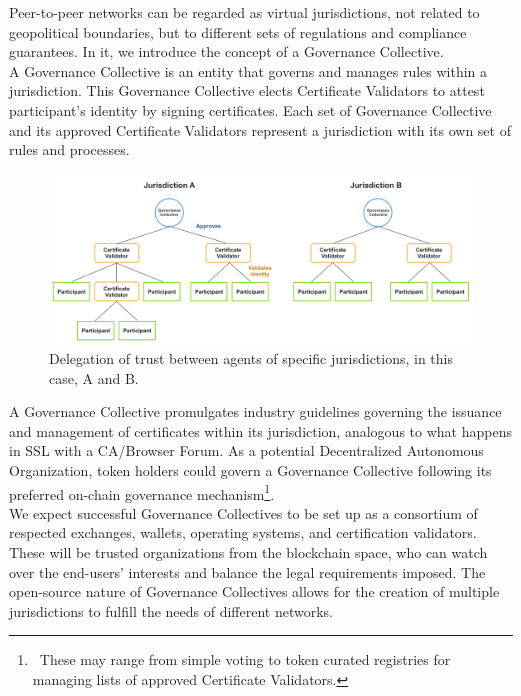\documentclass[10pt]{article}
\begin{document}
Peer-to-peer networks can be regarded as virtual jurisdictions, not related to geopolitical boundaries, but to different sets of regulations and compliance guarantees. In it, we introduce the concept of a Governance Collective. \\

\noindent A Governance Collective is an entity that governs and manages rules within a jurisdiction. This Governance Collective elects Certificate Validators to attest participant’s identity by signing certificates. Each set of Governance Collective and its approved Certificate Validators represent a jurisdiction with its own set of rules and processes.\\

\begin{figure}[ht]
    \centering
    \includegraphics[width=0.8\linewidth]{figures/figure1.png}
    \caption{Delegation of trust between agents of specific jurisdictions, in this case, A and B.}
    \label{fig:fig1}
\end{figure}

\noindent A Governance Collective promulgates industry guidelines governing the issuance and management of certificates within its jurisdiction, analogous to what happens in SSL with a CA/Browser Forum\cite{cabforum}. As a potential Decentralized Autonomous Organization, token holders could govern a Governance Collective following its preferred on-chain governance mechanism\footnote{\ These may range from simple voting to token curated registries for managing lists of approved Certificate Validators.}. \\

\noindent We expect successful Governance Collectives to be set up as a consortium of respected exchanges, wallets, operating systems, and certification validators. These will be trusted organizations from the blockchain space, who can watch over the end-users' interests and balance the legal requirements imposed. The open-source nature of Governance Collectives allows for the creation of multiple jurisdictions to fulfill the needs of different networks. \\
\end{document}
